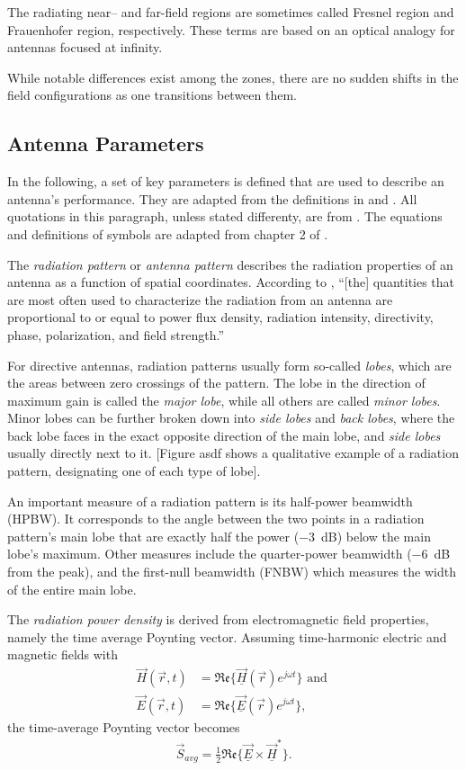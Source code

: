 The radiating near-- and far-field regions are sometimes called Fresnel region and Frauenhofer region, respectively.
These terms are based on an optical analogy for antennas focused at infinity.

While notable differences exist among the zones,
there are no sudden shifts in the field configurations as one transitions between them.

\subsection{Antenna Parameters}
\label{ssec:antenna_params}
In the following, a set of key parameters is defined that are used to describe an antenna's performance.
They are adapted from the definitions in \cite{ieee_defs} and \cite{balanis}.
All quotations in this paragraph, unless stated differenty, are from \cite{ieee_defs}.
The equations and definitions of symbols are adapted from chapter 2 of \cite{balanis}.

The \emph{radiation pattern} or \emph{antenna pattern}
describes the radiation properties of an antenna as a function of spatial coordinates.
According to \cite{ieee_defs}, ``[the] quantities that are most often used to characterize the radiation from an antenna
are proportional to or equal to power flux density,
radiation intensity, directivity, phase, polarization, and field strength.''

For directive antennas, radiation patterns usually form so-called \emph{lobes},
which are the areas between zero crossings of the pattern.
The lobe in the direction of maximum gain is called the \emph{major lobe},
while all others are called \emph{minor lobes}.
Minor lobes can be further broken down into \emph{side lobes} and \emph{back lobes},
where the back lobe faces in the exact opposite direction of the main lobe,
and \emph{side lobes} usually directly next to it.
    [Figure asdf shows a qualitative example of a radiation pattern,
        designating one of each type of lobe].

An important measure of a radiation pattern is its half-power beamwidth (HPBW).
It corresponds to the angle between the two points
in a radiation pattern's main lobe that are exactly half the power (\SI{-3}{\dB})
below the main lobe's maximum. Other measures include the quarter-power beamwidth
(\SI{-6}{\dB} from the peak), and the first-null beamwidth (FNBW) which measures the width of the entire main lobe.

The \emph{radiation power density} is derived from electromagnetic field properties,
namely the time average Poynting vector.
Assuming time-harmonic electric and magnetic fields with
\begin{align}
    \vec H(\vec r, t) & = \mathfrak{Re}\{\vec{\underline{H}}(\vec{r}) e^{j\omega t}\} \text{ and } \\
    \vec E(\vec r, t) & = \mathfrak{Re}\{\vec{\underline{E}}(\vec{r}) e^{j\omega t}\},
\end{align}
the time-average Poynting vector becomes
\begin{align}
    \vec S_{avg} = \frac{1}{2} \mathfrak{Re}\{ \underline{\vec E} \times \underline{\vec H}^* \}.
\end{align}

